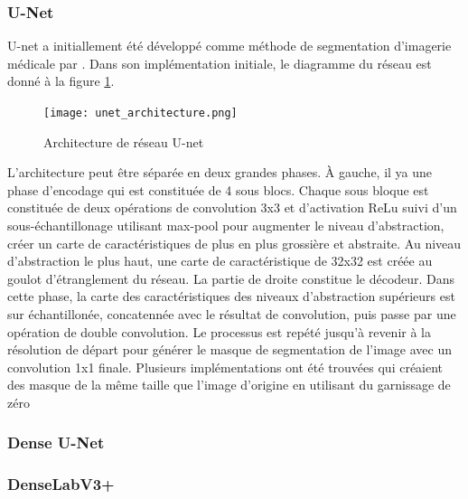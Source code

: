   \subsubsection{U-Net}
    U-net a initiallement été développé comme méthode de segmentation d'imagerie médicale par \textcite{Ronneberger:UNetConvolutional:2015}. Dans son implémentation initiale, le diagramme du réseau est donné à la figure \ref{fig:unet_arch}.
    \begin{figure}[!h]
      \centering
      \texttt{[image: unet\_architecture.png]}
      \caption{Architecture de réseau U-net \parencite{Ronneberger:UNetConvolutional:2015}}
      \label{fig:unet_arch}
    \end{figure}
    L'architecture peut être séparée en deux grandes phases. À gauche, il ya une phase d'encodage qui est constituée de 4 sous blocs. Chaque sous bloque est constituée de deux opérations de convolution 3x3 et d'activation \ac{ReLu} suivi d'un sous-échantillonage utilisant max-pool pour augmenter le niveau d'abstraction, créer un carte de caractéristiques de plus en plus grossière et abstraite. Au niveau d'abstraction le plus haut, une carte de caractéristique de 32x32 est créée au goulot d'étranglement du réseau. La partie de droite constitue le décodeur. Dans cette phase, la carte des caractéristiques des niveaux d'abstraction supérieurs est sur échantillonée, concatennée avec le résultat de convolution, puis passe par une opération de double convolution. Le processus est repété jusqu'à revenir à la résolution de départ pour générer le masque de segmentation de l'image avec un convolution 1x1 finale. Plusieurs implémentations ont été trouvées qui créaient des masque de la même taille que l'image d'origine en utilisant du garnissage de zéro 
  \subsubsection{Dense U-Net}

  \subsubsection{DenseLabV3+}
